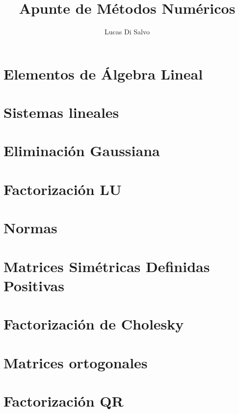 \documentclass[a4paper]{article}
\title{Apunte de Métodos Numéricos}
\author{Lucas Di Salvo}
\begin{document}
\maketitle

\thispagestyle{empty}
\vspace{1cm}
{
\hypersetup{linkcolor = black}
\tableofcontents
}
\newpage

\thispagestyle{empty}
\vspace{1cm}
\renewcommand*\listalgorithmname{Lista de Algoritmos}
{
\hypersetup{linkcolor = black}
\listofalgorithms}
\newpage

\section{Elementos de Álgebra Lineal}\label{section:elementos_de_algebra_lineal}

\newpage

\section{Sistemas lineales}\label{section:sistemas_lineales}

\newpage

\section{Eliminación Gaussiana}\label{section:eliminacion_gaussiana}

\newpage

\section{Factorización LU}\label{section:factorizacion_lu}

\newpage

\section{Normas}\label{section:normas}

\newpage

\section{Matrices Simétricas Definidas Positivas}\label{section:matrices_sdp}

\newpage

\section{Factorización de Cholesky}\label{section:factorizacion_de_cholesky}

\newpage

\section{Matrices ortogonales}\label{section:matrices_ortogonales}

\newpage

\section{Factorización QR}\label{section:factorizacon_qr}

\newpage
\end{document}
